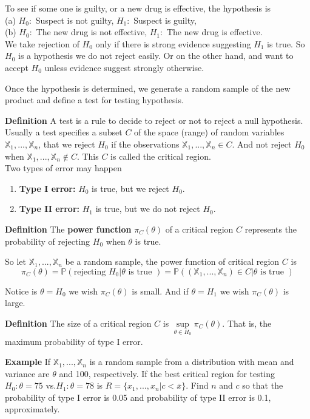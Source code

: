 To see if some one is guilty, or a new drug is effective, the hypothesis is\\
(a) $H_0: $ Suspect is not guilty, $H_1: $ Suspect is guilty, \\
(b) $H_0: $ The new drug is not effective, $H_1: $ The new drug is effective.\\

We take rejection of $H_0$ only if there is strong evidence suggesting $H_1$ is true. So $H_0$ is a hypothesis we do not reject easily. Or on the other hand, and want to accept $H_0$ unless evidence suggest strongly otherwise.

Once the hypothesis is determined, we generate a random sample of the new product and define a test for testing hypothesis.

\textbf{Definition} A test is a rule to decide to reject or not to reject a null hypothesis. Usually a test specifies a subset $C$ of the space (range) of random variables $\mathbb{X}_1, ..., \mathbb{X}_n$, that we reject $H_0$ if the observations $\mathbb{X}_1, ..., \mathbb{X}_n \in C$. And not reject $H_0$ when $\mathbb{X}_1, ..., \mathbb{X}_n \notin C$. This $C$ is called the critical region.\\

Two types of error may happen
\begin{enumerate}
\item \textbf{Type I error:} $H_0$ is true, but we reject $H_0$.
\item \textbf{Type II error:} $H_1$ is true, but we do not reject $H_0$.
\end{enumerate}

\textbf{Definition} The \textbf{power function} $\pi_C(\theta)$ of a critical region $C$ represents the probability of rejecting $H_0$ when $\theta$ is true.

So let $\mathbb{X}_1, ..., \mathbb{X}_n$ be a random sample, the power function of critical region $C$ is
$$\pi_C(\theta) = \mathbb{P}(\text{rejecting } H_0 | \theta \text{ is true }) = \mathbb{P}((\mathbb{X}_1, ..., \mathbb{X}_n)\in C | \theta \text{ is true })$$

Notice is $\theta = H_0$ we wish $\pi_C(\theta)$ is small. And if $\theta = H_1$ we wish $\pi_C(\theta)$ is large.

\textbf{Definition} The size of a critical region $C$ is $\underset{\theta \in H_0}{\sup}\pi_C(\theta)$. That is, the maximum probability of type I error.

\textbf{Example} If  $\mathbb{X}_1, ..., \mathbb{X}_n$ is a random sample from a distribution with mean and variance are $\theta$ and 100, respectively. If the best critical region for testing $H_0:\theta = 75$ vs.$ H_1 :\theta = 78$ is $R=\{x_1, ..., x_n | c < \bar{x}\}$. Find $n$ and $c$ so that the probability of type I error is 0.05 and probability of type II error is 0.1, approximately.

